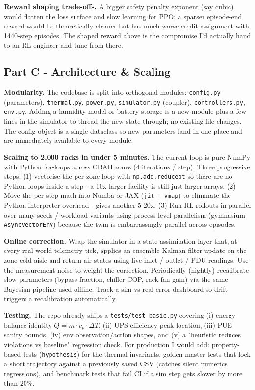 \documentclass[letterpaper,11pt]{article}
\begin{document}
	\textbf{Reward shaping trade-offs.} A bigger safety penalty exponent (say cubic) would flatten the loss surface and slow learning for PPO; a sparser episode-end reward would be theoretically cleaner but has much worse credit assignment with 1440-step episodes. The shaped reward above is the compromise I'd actually hand to an RL engineer and tune from there.
	
	\subsection{Part C - Architecture \& Scaling}
	\textbf{Modularity.} The codebase is split into orthogonal modules: \texttt{config.py} (parameters), \texttt{thermal.py}, \texttt{power.py}, \texttt{simulator.py} (coupler), \texttt{controllers.py}, \texttt{env.py}. Adding a humidity model or battery storage is a new module plus a few lines in the simulator to thread the new state through; no existing file changes. The config object is a single dataclass so new parameters land in one place and are immediately available to every module.
	
	\textbf{Scaling to 2,000 racks in under 5 minutes.} The current loop is pure NumPy with Python for-loops across CRAH zones (4 iterations / step). Three progressive steps: 
	(1) vectorise the per-zone loop with \texttt{np.add.reduceat} so there are no Python loops inside a step - a 10x larger facility is still just larger arrays. 
	(2) Move the per-step math into Numba or JAX (\texttt{jit} + \texttt{vmap}) to eliminate the Python interpreter overhead - gives another 5-20x. 
	(3) Run RL rollouts in parallel over many seeds / workload variants using process-level parallelism (gymnasium \texttt{AsyncVectorEnv}) because the twin is embarrassingly parallel across episodes.
	
	\textbf{Online correction.} Wrap the simulator in a state-assimilation layer that, at every real-world telemetry tick, applies an ensemble Kalman filter update on the zone cold-aisle and return-air states using live inlet / outlet / PDU readings. Use the measurement noise to weight the correction. Periodically (nightly) recalibrate slow parameters (bypass fraction, chiller COP, rack-fan gain) via the same Bayesian pipeline used offline. Track a sim-vs-real error dashboard so drift triggers a recalibration automatically.
	
	\textbf{Testing.} The repo already ships a \texttt{tests/test\_basic.py} covering (i) energy-balance identity $Q = \dot{m} \cdot c_p \cdot \Delta T$, (ii) UPS efficiency peak location, (iii) PUE sanity bounds, (iv) env observation/action shapes, and (v) a "heuristic reduces violations vs baseline" regression check. For production I would add: property-based tests (\texttt{hypothesis}) for the thermal invariants, golden-master tests that lock a short trajectory against a previously saved CSV (catches silent numerics regressions), and benchmark tests that fail CI if a sim step gets slower by more than $20\%$.
	
\end{document}
